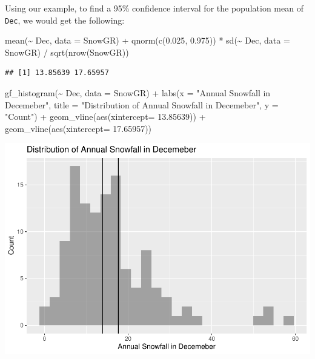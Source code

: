 \documentclass[12pt]{article}
\newenvironment{Shaded}{\begin{snugshade}}{\end{snugshade}}
\newcommand{\AttributeTok}[1]{\textcolor[rgb]{0.77,0.63,0.00}{#1}}
\newcommand{\FloatTok}[1]{\textcolor[rgb]{0.00,0.00,0.81}{#1}}
\newcommand{\FunctionTok}[1]{\textcolor[rgb]{0.00,0.00,0.00}{#1}}
\newcommand{\NormalTok}[1]{#1}
\newcommand{\SpecialCharTok}[1]{\textcolor[rgb]{0.00,0.00,0.00}{#1}}
\newcommand{\StringTok}[1]{\textcolor[rgb]{0.31,0.60,0.02}{#1}}
\begin{document}
Using our example, to find a 95\% confidence interval for the population
mean of \texttt{Dec}, we would get the following:

\begin{Shaded}
\begin{Highlighting}[]
\FunctionTok{mean}\NormalTok{(}\SpecialCharTok{\textasciitilde{}}\NormalTok{ Dec, }\AttributeTok{data =}\NormalTok{ SnowGR) }\SpecialCharTok{+} \FunctionTok{qnorm}\NormalTok{(}\FunctionTok{c}\NormalTok{(}\FloatTok{0.025}\NormalTok{, }\FloatTok{0.975}\NormalTok{)) }\SpecialCharTok{*} \FunctionTok{sd}\NormalTok{(}\SpecialCharTok{\textasciitilde{}}\NormalTok{ Dec, }\AttributeTok{data =}\NormalTok{ SnowGR) }\SpecialCharTok{/} \FunctionTok{sqrt}\NormalTok{(}\FunctionTok{nrow}\NormalTok{(SnowGR))}
\end{Highlighting}
\end{Shaded}

\begin{verbatim}
## [1] 13.85639 17.65957
\end{verbatim}

\begin{Shaded}
\begin{Highlighting}[]
\FunctionTok{gf\_histogram}\NormalTok{(}\SpecialCharTok{\textasciitilde{}}\NormalTok{ Dec, }\AttributeTok{data =}\NormalTok{ SnowGR) }\SpecialCharTok{+}
  \FunctionTok{labs}\NormalTok{(}\AttributeTok{x =} \StringTok{"Annual Snowfall in Decemeber"}\NormalTok{, }\AttributeTok{title =} \StringTok{"Distribution of Annual Snowfall in Decemeber"}\NormalTok{, }\AttributeTok{y =} \StringTok{"Count"}\NormalTok{) }\SpecialCharTok{+}
  \FunctionTok{geom\_vline}\NormalTok{(}\FunctionTok{aes}\NormalTok{(}\AttributeTok{xintercept=} \FloatTok{13.85639}\NormalTok{)) }\SpecialCharTok{+}
  \FunctionTok{geom\_vline}\NormalTok{(}\FunctionTok{aes}\NormalTok{(}\AttributeTok{xintercept=} \FloatTok{17.65957}\NormalTok{))}
\end{Highlighting}
\end{Shaded}

\includegraphics{paper_files/figure-latex/unnamed-chunk-5-1.pdf}
\end{document}
